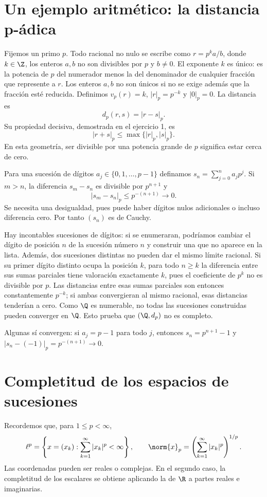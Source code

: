 \section{Un ejemplo aritmético: la distancia p-ádica}
Fijemos un primo $p$. Todo racional no nulo se escribe como $r=p^k a/b$, donde $k\in\Z$, los enteros $a,b$ no son divisibles por $p$ y $b\ne0$. El exponente $k$ es único: es la potencia de $p$ del numerador menos la del denominador de cualquier fracción que represente a $r$. Los enteros $a,b$ no son únicos si no se exige además que la fracción esté reducida. Definimos $v_p(r)=k$, $|r|_p=p^{-k}$ y $|0|_p=0$. La distancia es
\[
 d_p(r,s)=|r-s|_p.
\]
Su propiedad decisiva, demostrada en el ejercicio 1, es
\[
 |r+s|_p\leq\max\{|r|_p,|s|_p\}.
\]
En esta geometría, ser divisible por una potencia grande de $p$ significa estar cerca de cero.

\begin{ejemplo}\label{ch08:padica-incompleta}
Para una sucesión de dígitos $a_j\in\{0,1,\ldots,p-1\}$ definamos $s_n=\sum_{j=0}^n a_jp^j$. Si $m>n$, la diferencia $s_m-s_n$ es divisible por $p^{n+1}$ y
\[
 |s_m-s_n|_p\leq p^{-(n+1)}\longrightarrow0.
\]
Se necesita una desigualdad, pues puede haber dígitos nulos adicionales o incluso diferencia cero. Por tanto $(s_n)$ es de Cauchy.

Hay incontables sucesiones de dígitos: si se enumeraran, podríamos cambiar el dígito de posición $n$ de la sucesión número $n$ y construir una que no aparece en la lista. Además, dos sucesiones distintas no pueden dar el mismo límite racional. Si su primer dígito distinto ocupa la posición $k$, para todo $n\geq k$ la diferencia entre sus sumas parciales tiene valoración exactamente $k$, pues el coeficiente de $p^k$ no es divisible por $p$. Las distancias entre esas sumas parciales son entonces constantemente $p^{-k}$; si ambas convergieran al mismo racional, esas distancias tenderían a cero. Como $\Q$ es numerable, no todas las sucesiones construidas pueden converger en $\Q$. Esto prueba que $(\Q,d_p)$ no es completo.

Algunas sí convergen: si $a_j=p-1$ para todo $j$, entonces $s_n=p^{n+1}-1$ y $|s_n-(-1)|_p=p^{-(n+1)}\to0$.
\end{ejemplo}

\section{Completitud de los espacios de sucesiones}
Recordemos que, para $1\leq p<\infty$,
\[
 \ell^p=\left\{x=(x_k):\sum_{k=1}^\infty|x_k|^p<\infty\right\},
 \qquad \norm{x}_p=\left(\sum_{k=1}^\infty|x_k|^p\right)^{1/p}.
\]
Las coordenadas pueden ser reales o complejas. En el segundo caso, la completitud de los escalares se obtiene aplicando la de $\R$ a partes reales e imaginarias.

